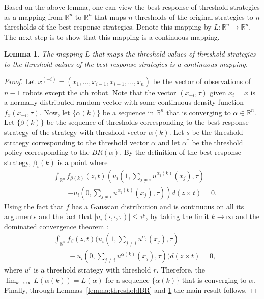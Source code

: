 \documentclass[defaultstyle,12pt]{thesis}
\newtheorem{lemma}{Lemma}
\newcommand{\R}{\mathbb{R}}    %
\begin{document}
Based on the above lemma, one can view the best-response of threshold strategies as a mapping from $\R^n$ to $\R^n$ that maps $n$ thresholds of the original strategies to $n$ thresholds of the best-response strategies. Denote this mapping by $L:\R^n\to\R^n$. The next step is to show that this mapping is a continuous mapping. 
\begin{lemma}\label{lemma:continuous}
The mapping $L$ that maps the threshold values of threshold strategies to the threshold values of the best-response strategies is a continuous mapping. 
\end{lemma}
\begin{proof}
Let $x^{(-i)}=(x_1,\ldots,x_{i-1},x_{i+1},\ldots,x_n)$ be the vector of observations of $n-1$ robots except the $i$th robot. Note that the vector $(x_{-i},\tau)$ given $x_i=x$ is a normally distributed random vector with some continuous density function $f_{x}(x_{-i},\tau)$. Now, let $\{\alpha(k)\}$ be a sequence in $\R^n$ that is converging to $\alpha\in\R^n$. Let $\{\beta(k)\}$ be the sequence of thresholds corresponding to the best-response strategy of the strategy with threshold vector $\alpha(k)$. Let $s$ be the threshold strategy corresponding to the threshold vector $\alpha$ and let $\alpha^*$ be the threshold policy corresponding to the $BR(\alpha)$. By the definition of the best-response strategy, $\beta_i(k)$ is a point where 
\begin{align*}
&\int_{\R^{n}}f_{\beta(k)}(z,t)\left(u_i(1,\sum_{j\not=i}u^{\alpha_j(k)}(x_j),\tau)\right.\\
&\qquad\left.-u_i(0,\sum_{j\not=i}u^{\alpha_j(k)}(x_j),\tau)\right)d(z\times t)=0.
\end{align*}
Using the fact that $f$ has a Gaussian distribution and is continuous on all its arguments and the fact that $|u_i(\cdot,\cdot,\tau)|\leq \tau^p$, by taking the limit $k\to\infty$ and the dominated convergence theorem \cite{Folland2013}:
\begin{align*}
&\int_{\R^{n}}f_{\beta}(z,t)(u_i(1,\sum_{j\not=i}u^{\alpha_j}(x_j),\tau)\\ 
&\qquad-u_i(0,\sum_{j\not=i}u^{\alpha(k)}(x_j),\tau))d(z\times t)=0,
\end{align*}
where $u^{r}$ is a threshold strategy with threshold $r$. Therefore, the $\lim_{k\to\infty}L(\alpha(k))=L(\alpha)$ for a sequence $\{\alpha(k)\}$ that is converging to $\alpha$. Finally, through Lemmas~\ref{lemma:thresholdBR} and \ref{lemma:continuous} the main result follows. 
\end{proof}
\end{document}
